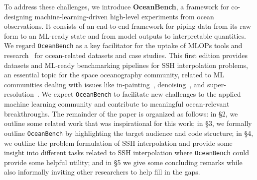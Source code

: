 To address these challenges, we introduce \textbf{OceanBench}, a framework for co-designing machine-learning-driven high-level experiments from ocean observations. 
It consists of an end-to-end framework for piping data from its raw form to an ML-ready state and from model outputs to interpretable quantities. 
We regard \texttt{OceanBench} as a key facilitator for the uptake of MLOPs tools and research~\cite{MLOPS1,MLOPS2} for ocean-related datasets and case studies. This first edition provides datasets and ML-ready benchmarking pipelines for SSH interpolation problems, an essential topic for the space oceanography community, related to ML communities dealing with issues like in-painting~\cite{InPaintingSurvey}, denoising~\cite{DENOISESURVEY,DENOISESURVEY2}, and super-resolution~\cite{SuperResSurvey}. 
We expect \texttt{OceanBench} to facilitate new challenges to the applied machine learning community and contribute to meaningful ocean-relevant breakthroughs.
%
The remainder of the paper is organized as follows: in \S2, we outline some related work that was inspirational for this work; in \S3, we formally outline \texttt{OceanBench} by highlighting the target audience and code structure; in \S4, we outline the problem formulation of SSH interpolation and provide some insight into different tasks related to SSH interpolation where \texttt{OceanBench} could provide some helpful utility; and in \S5 we give some concluding remarks while also informally inviting other researchers to help fill in the gaps.





